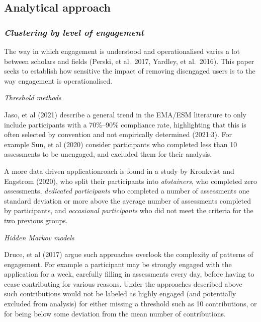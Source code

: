 \documentclass[
]{article}
\begin{document}
\hypertarget{analytical-approach}{%
\subsection{Analytical approach}\label{analytical-approach}}

\hypertarget{clustering-by-level-of-engagement}{%
\subsubsection{\texorpdfstring{\emph{Clustering by level of
engagement}}{Clustering by level of engagement}}\label{clustering-by-level-of-engagement}}

The way in which engagement is understood and operationalised varies a
lot between scholars and fields (Perski, et al.~2017, Yardley, et
al.~2016). This paper seeks to establish how sensitive the impact of
removing disengaged users is to the way engagement is operationalised.

\emph{Threshold methods}

Jaso, et al (2021) describe a general trend in the EMA/ESM literature to
only include participants with a 70\%--90\% compliance rate,
highlighting that this is often selected by convention and not
empirically determined (2021:3). For example Sun, et al (2020) consider
participants who completed less than 10 assessments to be unengaged, and
excluded them for their analysis.

A more data driven applicationroach is found in a study by Kronkvist and
Engstrom (2020), who split their participants into \emph{abstainers},
who completed zero assessments, \emph{dedicated participants} who
completed a number of assessments one standard deviation or more above
the average number of assessments completed by participants, and
\emph{occasional participants} who did not meet the criteria for the two
previous groups.

\emph{Hidden Markov models}

Druce, et al (2017) argue such approaches overlook the complexity of
patterns of engagement. For example a participant may be strongly
engaged with the application for a week, carefully filling in
assessments every day, before having to cease contributing for various
reasons. Under the approaches described above such contributions would
not be labeled as highly engaged (and potentially excluded from
analysis) for either missing a threshold such as 10 contributions, or
for being below some deviation from the mean number of contributions.
\end{document}
